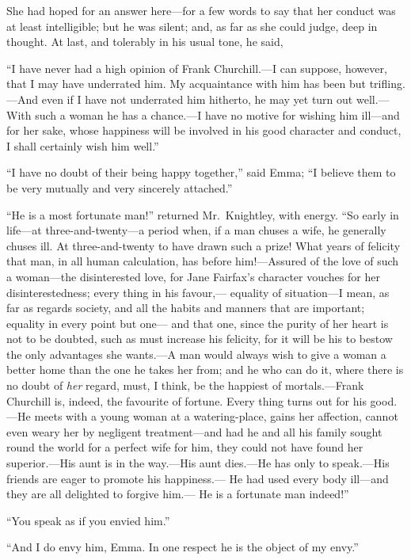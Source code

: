She had hoped for an answer here---for a few words to say that her
conduct was at least intelligible; but he was silent; and, as far
as she could judge, deep in thought.  At last, and tolerably
in his usual tone, he said,

``I have never had a high opinion of Frank Churchill.---I can suppose,
however, that I may have underrated him.  My acquaintance with
him has been but trifling.---And even if I have not underrated
him hitherto, he may yet turn out well.---With such a woman he has
a chance.---I have no motive for wishing him ill---and for her sake,
whose happiness will be involved in his good character and conduct,
I shall certainly wish him well.''

``I have no doubt of their being happy together,'' said Emma;
``I believe them to be very mutually and very sincerely attached.''

``He is a most fortunate man!'' returned Mr.\ Knightley, with energy.
``So early in life---at three-and-twenty---a period when, if a man
chuses a wife, he generally chuses ill.  At three-and-twenty
to have drawn such a prize!  What years of felicity that man,
in all human calculation, has before him!---Assured of the love of
such a woman---the disinterested love, for Jane Fairfax's character
vouches for her disinterestedness; every thing in his favour,---%
equality of situation---I mean, as far as regards society, and all the
habits and manners that are important; equality in every point but one---%
and that one, since the purity of her heart is not to be doubted,
such as must increase his felicity, for it will be his to bestow the
only advantages she wants.---A man would always wish to give a woman
a better home than the one he takes her from; and he who can do it,
where there is no doubt of \emph{her} regard, must, I think, be the happiest
of mortals.---Frank Churchill is, indeed, the favourite of fortune.
Every thing turns out for his good.---He meets with a young woman
at a watering-place, gains her affection, cannot even weary her
by negligent treatment---and had he and all his family sought round
the world for a perfect wife for him, they could not have found
her superior.---His aunt is in the way.---His aunt dies.---He has
only to speak.---His friends are eager to promote his happiness.---%
He had used every body ill---and they are all delighted to forgive him.---%
He is a fortunate man indeed!''

``You speak as if you envied him.''

``And I do envy him, Emma.  In one respect he is the object of my envy.''

